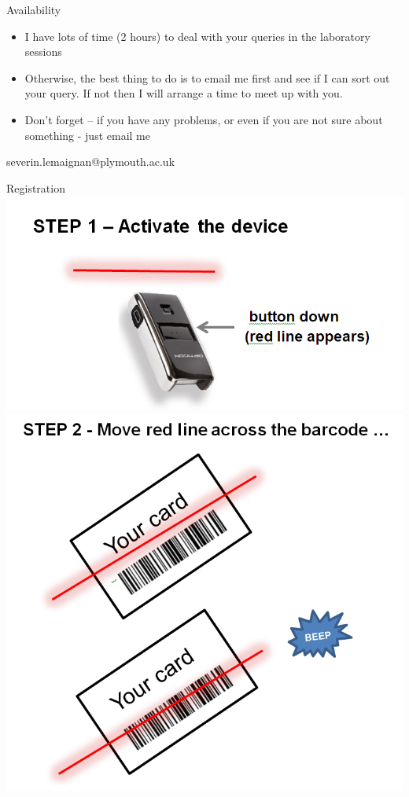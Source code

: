 \documentclass[compress]{beamer}
\begin{document}
\begin{frame}{Availability}

    \begin{itemize}
        \item I have lots of time (2 hours) to deal with your queries in the laboratory sessions
        \item  Otherwise, the best thing to do is to email me first and see if I can sort out your query. If not then I will arrange a time to meet up with you.
        \item Don't forget – if you have any problems, or even if you are not sure about something - just email me

    \end{itemize}

    \begin{center}
        severin.lemaignan@plymouth.ac.uk
    \end{center}
\end{frame}

\begin{frame}{Registration}
        \centering
        \includegraphics[width=0.4\linewidth]{registration1}
        \includegraphics[width=0.4\linewidth]{registration2}
\end{frame}
\end{document}

